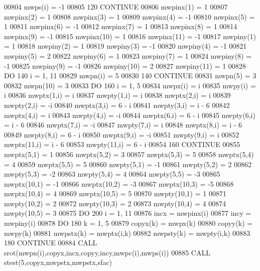\begin{DoxyCode}
00804          mwps(i) = -1
00805   120 \textcolor{keywordflow}{CONTINUE}
00806       mwpinx(1) = 1
00807       mwpinx(2) = 1
00808       mwpinx(3) = 1
00809       mwpinx(4) = -1
00810       mwpinx(5) = 1
00811       mwpinx(6) = -1
00812       mwpinx(7) = 1
00813       mwpinx(8) = 1
00814       mwpinx(9) = -1
00815       mwpinx(10) = 1
00816       mwpinx(11) = -1
00817       mwpiny(1) = 1
00818       mwpiny(2) = 1
00819       mwpiny(3) = -1
00820       mwpiny(4) = -1
00821       mwpiny(5) = 2
00822       mwpiny(6) = 1
00823       mwpiny(7) = 1
00824       mwpiny(8) = -1
00825       mwpiny(9) = -1
00826       mwpiny(10) = 2
00827       mwpiny(11) = 1
00828       \textcolor{keywordflow}{DO} 140 i = 1, 11
00829          mwpn(i) = 5
00830   140 \textcolor{keywordflow}{CONTINUE}
00831       mwpn(5) = 3
00832       mwpn(10) = 3
00833       \textcolor{keywordflow}{DO} 160 i = 1, 5
00834          mwpx(i) = i
00835          mwpy(i) = i
00836          mwptx(1,i) = i
00837          mwpty(1,i) = i
00838          mwptx(2,i) = i
00839          mwpty(2,i) = -i
00840          mwptx(3,i) = 6 - i
00841          mwpty(3,i) = i - 6
00842          mwptx(4,i) = i
00843          mwpty(4,i) = -i
00844          mwptx(6,i) = 6 - i
00845          mwpty(6,i) = i - 6
00846          mwptx(7,i) = -i
00847          mwpty(7,i) = i
00848          mwptx(8,i) = i - 6
00849          mwpty(8,i) = 6 - i
00850          mwptx(9,i) = -i
00851          mwpty(9,i) = i
00852          mwptx(11,i) = i - 6
00853          mwpty(11,i) = 6 - i
00854   160 \textcolor{keywordflow}{CONTINUE}
00855       mwptx(5,1) = 1
00856       mwptx(5,2) = 3
00857       mwptx(5,3) = 5
00858       mwptx(5,4) = 4
00859       mwptx(5,5) = 5
00860       mwpty(5,1) = -1
00861       mwpty(5,2) = 2
00862       mwpty(5,3) = -2
00863       mwpty(5,4) = 4
00864       mwpty(5,5) = -3
00865       mwptx(10,1) = -1
00866       mwptx(10,2) = -3
00867       mwptx(10,3) = -5
00868       mwptx(10,4) = 4
00869       mwptx(10,5) = 5
00870       mwpty(10,1) = 1
00871       mwpty(10,2) = 2
00872       mwpty(10,3) = 2
00873       mwpty(10,4) = 4
00874       mwpty(10,5) = 3
00875       \textcolor{keywordflow}{DO} 200 i = 1, 11
00876          incx = mwpinx(i)
00877          incy = mwpiny(i)
00878          \textcolor{keywordflow}{DO} 180 k = 1, 5
00879             copyx(k) = mwpx(k)
00880             copyy(k) = mwpy(k)
00881             mwpstx(k) = mwptx(i,k)
00882             mwpsty(k) = mwpty(i,k)
00883   180    \textcolor{keywordflow}{CONTINUE}
00884          \textcolor{keyword}{CALL }srot(mwpn(i),copyx,incx,copyy,incy,mwpc(i),mwps(i))
00885          \textcolor{keyword}{CALL }stest(5,copyx,mwpstx,mwpstx,sfac)

\end{DoxyCode}
